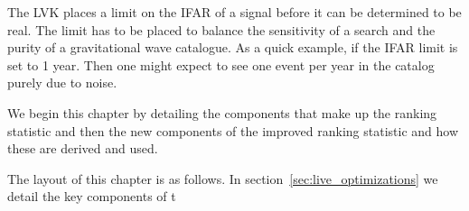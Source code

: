 The LVK places a limit on the IFAR of a signal before it can be determined to be real. The limit has to be placed to balance the sensitivity of a search and the purity of a gravitational wave catalogue. As a quick example, if the IFAR limit is set to 1 year. Then one might expect to see one event per year in the catalog purely due to noise.

We begin this chapter by detailing the components that make up the ranking statistic and then the new components of the improved ranking statistic and how these are derived and used.

The layout of this chapter is as follows. In section~\ref{sec:live_optimizations} we detail the key components of t

